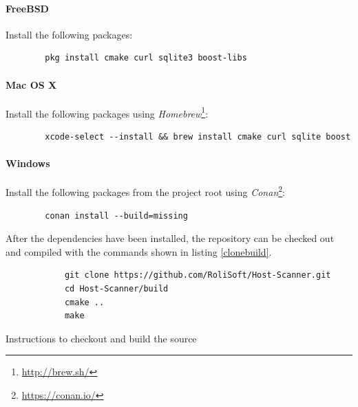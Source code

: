 \documentclass[a4paper,12pt]{article}
\begin{document}
	\vspace{-0.4in}
	\paragraph*{FreeBSD} Install the following packages:
	
	\begin{listing}[H]
	\begin{verbatim}
		pkg install cmake curl sqlite3 boost-libs
	\end{verbatim}
	\end{listing}
		
	\vspace{-0.4in}
	\paragraph*{Mac OS X} Install the following packages using \textit{Homebrew}\footnote{\url{http://brew.sh/}}:
	
	\begin{listing}[H]
	\begin{verbatim}
		xcode-select --install && brew install cmake curl sqlite boost
	\end{verbatim}
	\end{listing}
		
	\vspace{-0.4in}
	\paragraph*{Windows} Install the following packages from the project root using \textit{Conan}\footnote{\url{https://conan.io/}}:
	
	\begin{listing}[H]
	\begin{verbatim}
		conan install --build=missing
	\end{verbatim}
	\end{listing}
	
	\vspace{-0.2in}
	After the dependencies have been installed, the repository can be checked out and compiled with the commands shown in listing \ref{clonebuild}.
	
	\begin{listing}[H]
		\begin{verbatim}
			git clone https://github.com/RoliSoft/Host-Scanner.git
			cd Host-Scanner/build
			cmake ..
			make
		\end{verbatim}
		\caption{Instructions to checkout and build the source}
		\label{clonebuild}
	\end{listing}
	
\end{document}
